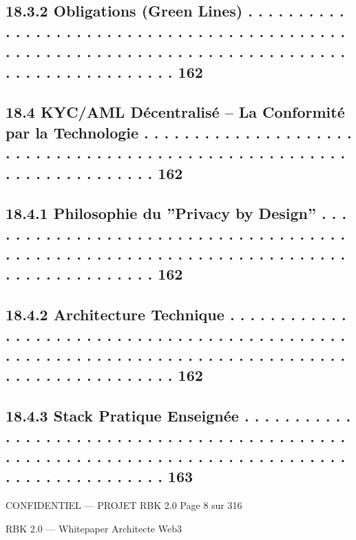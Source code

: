 \subsection{18.3.2            Obligations (Green Lines) . . . . . . . . . . . . . . . . . . . . . . . . . . . . . . . . . . . . . . . . . . . . . . . . . . . . . . . . . . . . . . . . . . . . . . . . . . . . . . . . . . . . . . . . . . . . . . . 162}
\subsection{18.4    KYC/AML Décentralisé – La Conformité par la Technologie . . . . . . . . . . . . . . . . . . . . . . . . . . . . . . . . . . . . . . . . . . . . . . . . . . . . . . . . . . . . . . . . . . . . . . 162}
\subsection{18.4.1            Philosophie du ”Privacy by Design” . . . . . . . . . . . . . . . . . . . . . . . . . . . . . . . . . . . . . . . . . . . . . . . . . . . . . . . . . . . . . . . . . . . . . . . . . . . . . . . . . . . . . . 162}
\subsection{18.4.2            Architecture Technique . . . . . . . . . . . . . . . . . . . . . . . . . . . . . . . . . . . . . . . . . . . . . . . . . . . . . . . . . . . . . . . . . . . . . . . . . . . . . . . . . . . . . . . . . . . . . . . . . 162}
\subsection{18.4.3            Stack Pratique Enseignée . . . . . . . . . . . . . . . . . . . . . . . . . . . . . . . . . . . . . . . . . . . . . . . . . . . . . . . . . . . . . . . . . . . . . . . . . . . . . . . . . . . . . . . . . . . . . . . 163}
\vspace{0.5em}
\vspace{0.5em}
\vspace{0.5em}
\begin{confidential}CONFIDENTIEL — PROJET RBK 2.0                                                                           Page 8 sur 316\end{confidential}
RBK 2.0 — Whitepaper Architecte Web3\\
\vspace{0.5em}
\vspace{0.5em}
